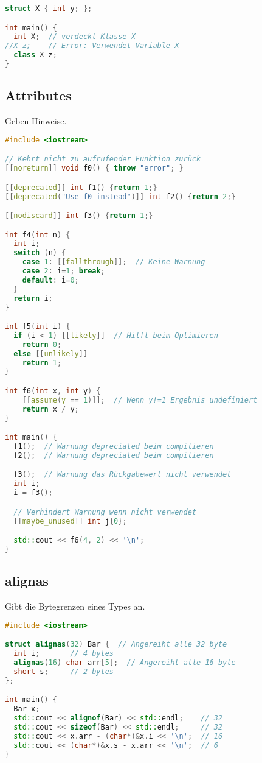 \documentclass[10pt,twocolumn]{scrartcl}
\begin{document}
\begin{lstlisting}[language=C++]
struct X { int y; };

int main() {
  int X;  // verdeckt Klasse X
//X z;    // Error: Verwendet Variable X
  class X z;
}
\end{lstlisting}

\subsection{Attributes}

Geben Hinweise.

\begin{lstlisting}[language=C++]
#include <iostream>

// Kehrt nicht zu aufrufender Funktion zurück
[[noreturn]] void f0() { throw "error"; }

[[deprecated]] int f1() {return 1;}
[[deprecated("Use f0 instead")]] int f2() {return 2;}

[[nodiscard]] int f3() {return 1;}

int f4(int n) {
  int i;
  switch (n) {
    case 1: [[fallthrough]];  // Keine Warnung
    case 2: i=1; break;
    default: i=0;
  }
  return i;
}

int f5(int i) {
  if (i < 1) [[likely]]  // Hilft beim Optimieren
    return 0;
  else [[unlikely]]
    return 1;
}

int f6(int x, int y) {
    [[assume(y == 1)]];  // Wenn y!=1 Ergebnis undefiniert
    return x / y;
}

int main() {
  f1();  // Warnung depreciated beim compilieren
  f2();  // Warnung depreciated beim compilieren

  f3();  // Warnung das Rückgabewert nicht verwendet
  int i;
  i = f3();

  // Verhindert Warnung wenn nicht verwendet
  [[maybe_unused]] int j{0};

  std::cout << f6(4, 2) << '\n';
}
\end{lstlisting}

\subsection{alignas}

Gibt die Bytegrenzen eines Types an.

\begin{lstlisting}[language=C++]
#include <iostream>

struct alignas(32) Bar {  // Angereiht alle 32 byte
  int i;       // 4 bytes
  alignas(16) char arr[5];  // Angereiht alle 16 byte
  short s;     // 2 bytes
};

int main() {
  Bar x;
  std::cout << alignof(Bar) << std::endl;    // 32
  std::cout << sizeof(Bar) << std::endl;     // 32
  std::cout << x.arr - (char*)&x.i << '\n';  // 16
  std::cout << (char*)&x.s - x.arr << '\n';  // 6
}
\end{lstlisting}
\end{document}
